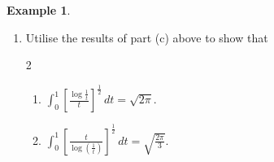 \documentclass[12pt,a4paper]{report}
\theoremstyle{definition}
\newtheorem{exa}[thm]{Example}
\theoremstyle{plain}
\begin{document}
\begin{exa}
\begin{enumerate}
\begin{proof}[Working]
Next, let $u = v^{\alpha}, \, \, du = \alpha \, v^{\alpha -1}, $ and $v = u^{\frac{1}{\alpha}}$. Thus
\begin{align*}
\int^1_0\left[\log\left(\frac{1}{v}\right)\right]^{x-1} \, v^{\alpha - 1}\, dv & = \int_0^1\left[\log\left(\frac{1}{u^{\frac{1}{\alpha}}}\right)\right]^{x - 1}\, \frac{du}{\alpha}\\
& = \frac{1}{\alpha}\int_0^1\left[\log\left(\frac{1}{u}\right)^{\frac{1}{\alpha}}\right]^{x-1}\, du\\
& = \frac{1}{\alpha}\int_0^1\left[\frac{1}{\alpha}\, \log\frac{1}{u}\right]^{x-1}\, du\, , \hspace{0.3cm} \text{by property of logs}\\
& = \frac{1}{\alpha^x}\int_0^1\left[\log \left(\frac{1}{u}\right)\right]^{x-1}\, du\\
& = \frac{1}{\alpha^x}\, \Gamma(x),\,\hspace{0.3cm}\text{by part earlier past}.
\end{align*}
\end{proof}



\item[(d).] Utilise the results of part (c) above to show that
\begin{multicols}{2}
\begin{enumerate}
\item[(i).] $\displaystyle{\int_0^1 \left[\frac{\log\frac{1}{t}}{t}\right]^{\frac{1}{2}}\, dt = \sqrt{2\pi}}.$

\item[(ii).] $\displaystyle{\int_0^1\left[\frac{t}{\log\left(\frac{1}{t}\right)}\right]^{\frac{1}{2}}\, dt = \sqrt{\frac{2\pi}{3}}}.$
\end{enumerate}
\end{multicols}


\end{enumerate}
\end{exa}
\end{document}
